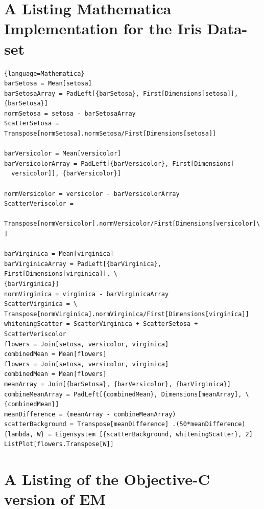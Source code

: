 \documentclass[11pt]{article}
\begin{document}






\appendix


\section{A Listing Mathematica Implementation for the Iris Data-set}
\label{listing-mathematica-iris}
\begin{lstlisting}{language=Mathematica}
barSetosa = Mean[setosa]
barSetosaArray = PadLeft[{barSetosa}, First[Dimensions[setosa]], {barSetosa}]
normSetosa = setosa - barSetosaArray
ScatterSetosa = Transpose[normSetosa].normSetosa/First[Dimensions[setosa]]

barVersicolor = Mean[versicolor]
barVersicolorArray = PadLeft[{barVersicolor}, First[Dimensions[
  versicolor]], {barVersicolor}]

normVersicolor = versicolor - barVersicolorArray
ScatterVeriscolor =
         Transpose[normVersicolor].normVersicolor/First[Dimensions[versicolor]\
]

barVirginica = Mean[virginica]
barVirginicaArray = PadLeft[{barVirginica}, First[Dimensions[virginica]], \
{barVirginica}]
normVirginica = virginica - barVirginicaArray
ScatterVirginica = \
Transpose[normVirginica].normVirginica/First[Dimensions[virginica]]
whiteningScatter = ScatterVirginica + ScatterSetosa + ScatterVeriscolor
flowers = Join[setosa, versicolor, virginica]
combinedMean = Mean[flowers]
flowers = Join[setosa, versicolor, virginica]
combinedMean = Mean[flowers]
meanArray = Join[{barSetosa}, {barVersicolor}, {barVirginica}]
combineMeanArray = PadLeft[{combinedMean}, Dimensions[meanArray], \
{combinedMean}]
meanDifference = (meanArray - combineMeanArray)
scatterBackground = Transpose[meanDifference] .(50*meanDifference)
{lambda, W} = Eigensystem [{scatterBackground, whiteningScatter}, 2]
ListPlot[flowers.Transpose[W]]
\end{lstlisting}

\section {A Listing of the Objective-C version of EM}
\end{document}
